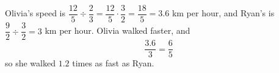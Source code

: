 Olivia's speed is $\dfrac{12}{5}\div\dfrac{2}{3}=\dfrac{12}{5}\cdot\dfrac{3}{2}=\dfrac{18}{5}=3.6$ km per hour, and Ryan's is $\dfrac{9}{2}\div\dfrac{3}{2}=3$ km per hour. Olivia walked faster, and
\[
\dfrac{3.6}{3}=\boxed{\dfrac{6}{5}}
\]
so she walked $1.2$ times as fast as Ryan.
